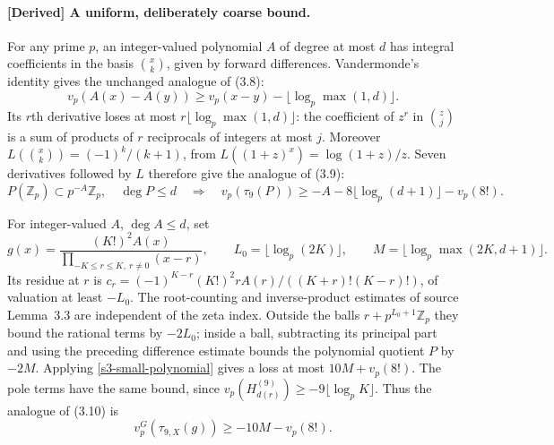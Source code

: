\paragraph{\textnormal{[Derived] A uniform, deliberately coarse bound.}}
For any prime $p$, an integer-valued polynomial $A$ of degree at most $d$
has integral coefficients in the basis $\binom{x}{k}$, given by forward
differences.  Vandermonde's identity gives the unchanged analogue of (3.8):
\[
 v_p(A(x)-A(y))\geq v_p(x-y)-\lfloor\log_p\max(1,d)\rfloor.
\]
Its $r$th derivative loses at most $r\lfloor\log_p\max(1,d)\rfloor$:
the coefficient of $z^r$ in $\binom{z}{j}$ is a sum of products of $r$
reciprocals of integers at most $j$.  Moreover
$L(\binom{x}{k})=(-1)^k/(k+1)$, from
$L((1+z)^x)=\log(1+z)/z$.  Seven derivatives followed by $L$ therefore
give the analogue of (3.9):
\begin{equation}
 P(\mathbb Z_p)\subset p^{-A}\mathbb Z_p,\quad\deg P\leq d
 \quad\Longrightarrow\quad
 v_p(\tau_9(P))\geq-A-8\lfloor\log_p(d+1)\rfloor-v_p(8!).
 \label{s3-small-polynomial}
\end{equation}

For integer-valued $A$, $\deg A\leq d$, set
\[
 g(x)=\frac{(K!)^2A(x)}{\prod_{-K\leq r\leq K,\ r\ne0}(x-r)},
 \qquad L_0=\lfloor\log_p(2K)\rfloor,
 \qquad M=\lfloor\log_p\max(2K,d+1)\rfloor.
\]
Its residue at $r$ is
$c_r=(-1)^{K-r}(K!)^2rA(r)/((K+r)!(K-r)!)$, of valuation at least
$-L_0$.  The root-counting and inverse-product estimates of source
Lemma~3.3 are independent of the zeta index.  Outside the balls
$r+p^{L_0+1}\mathbb Z_p$ they bound the rational terms by $-2L_0$;
inside a ball, subtracting its principal part and using the preceding
difference estimate bounds the polynomial quotient $P$ by $-2M$.
Applying \eqref{s3-small-polynomial} gives a loss at most $10M+v_p(8!)$.
The pole terms have the same bound, since
$v_p(H_{d(r)}^{(9)})\geq-9\lfloor\log_pK\rfloor$.
Thus the analogue of (3.10) is
\begin{equation}
 v_p^G(\tau_{9,X}(g))\geq-10M-v_p(8!).
 \label{s3-small-rational}
\end{equation}

